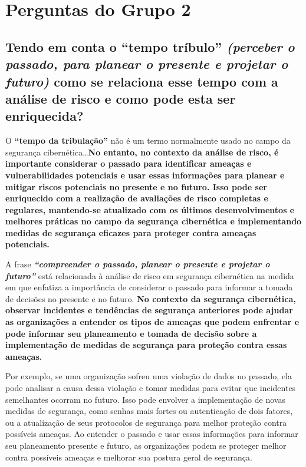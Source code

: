\chapter{Perguntas do Grupo 2}

\section[Pergunta]{Tendo em conta o \textbf{``tempo tríbulo''} \textit{(perceber o passado, para planear o presente e projetar o futuro)} como se relaciona esse tempo com a análise de risco e como pode esta ser enriquecida?}

O \textbf{``tempo da tribulação''} não é um termo normalmente usado no campo da segurança cibernética\ldots \textbf{No entanto, no contexto da análise de risco, é importante considerar o passado para identificar ameaças e vulnerabilidades potenciais e usar essas informações para planear e mitigar riscos potenciais no presente e no futuro. Isso pode ser enriquecido com a realização de avaliações de risco completas e regulares, mantendo-se atualizado com os últimos desenvolvimentos e melhores práticas no campo da segurança cibernética e implementando medidas de segurança eficazes para proteger contra ameaças potenciais.}

A frase \textbf{\textit{``compreender o passado, planear o presente e projetar o futuro''}} está relacionada à análise de risco em segurança cibernética na medida em que enfatiza a importância de considerar o passado para informar a tomada de decisões no presente e no futuro. \textbf{No contexto da segurança cibernética, observar incidentes e tendências de segurança anteriores pode ajudar as organizações a entender os tipos de ameaças que podem enfrentar e pode informar seu planeamento e tomada de decisão sobre a implementação de medidas de segurança para proteção contra essas ameaças.}

Por exemplo, se uma organização sofreu uma violação de dados no passado, ela pode analisar a causa dessa violação e tomar medidas para evitar que incidentes semelhantes ocorram no futuro. Isso pode envolver a implementação de novas medidas de segurança, como senhas mais fortes ou autenticação de dois fatores, ou a atualização de seus protocolos de segurança para melhor proteção contra possíveis ameaças. Ao entender o passado e usar essas informações para informar seu planeamento presente e futuro, as organizações podem se proteger melhor contra possíveis ameaças e melhorar sua postura geral de segurança.

